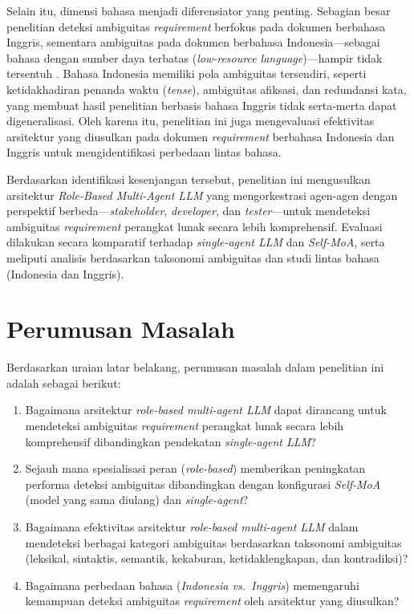 Selain itu, dimensi bahasa menjadi diferensiator yang penting. Sebagian besar penelitian deteksi ambiguitas \textit{requirement} berfokus pada dokumen berbahasa Inggris, sementara ambiguitas pada dokumen berbahasa Indonesia—sebagai bahasa dengan sumber daya terbatas (\textit{low-resource language})—hampir tidak tersentuh \cite{bashir2025}. Bahasa Indonesia memiliki pola ambiguitas tersendiri, seperti ketidakhadiran penanda waktu (\textit{tense}), ambiguitas afiksasi, dan redundansi kata, yang membuat hasil penelitian berbasis bahasa Inggris tidak serta-merta dapat digeneralisasi. Oleh karena itu, penelitian ini juga mengevaluasi efektivitas arsitektur yang diusulkan pada dokumen \textit{requirement} berbahasa Indonesia dan Inggris untuk mengidentifikasi perbedaan lintas bahasa.

Berdasarkan identifikasi kesenjangan tersebut, penelitian ini mengusulkan arsitektur \textit{Role-Based Multi-Agent LLM} yang mengorkestrasi agen-agen dengan perspektif berbeda—\textit{stakeholder}, \textit{developer}, dan \textit{tester}—untuk mendeteksi ambiguitas \textit{requirement} perangkat lunak secara lebih komprehensif. Evaluasi dilakukan secara komparatif terhadap \textit{single-agent LLM} dan \textit{Self-MoA}, serta meliputi analisis berdasarkan taksonomi ambiguitas dan studi lintas bahasa (Indonesia dan Inggris).

\section{Perumusan Masalah}
Berdasarkan uraian latar belakang, perumusan masalah dalam penelitian ini adalah sebagai berikut:
\begin{enumerate}
	\item Bagaimana arsitektur \textit{role-based multi-agent LLM} dapat dirancang untuk mendeteksi ambiguitas \textit{requirement} perangkat lunak secara lebih komprehensif dibandingkan pendekatan \textit{single-agent LLM}?
	\item Sejauh mana spesialisasi peran (\textit{role-based}) memberikan peningkatan performa deteksi ambiguitas dibandingkan dengan konfigurasi \textit{Self-MoA} (model yang sama diulang) dan \textit{single-agent}?
	\item Bagaimana efektivitas arsitektur \textit{role-based multi-agent LLM} dalam mendeteksi berbagai kategori ambiguitas berdasarkan taksonomi ambiguitas (leksikal, sintaktis, semantik, kekaburan, ketidaklengkapan, dan kontradiksi)?
	\item Bagaimana perbedaan bahasa (\textit{Indonesia vs.\ Inggris}) memengaruhi kemampuan deteksi ambiguitas \textit{requirement} oleh arsitektur yang diusulkan?
\end{enumerate}

